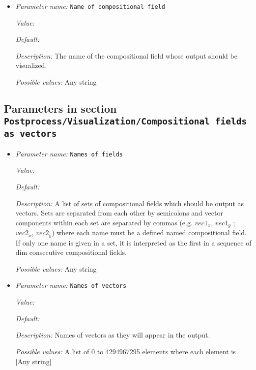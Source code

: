 \begin{itemize}
\item {\it Parameter name:} {\tt Name of compositional field}
\label{parameters:Postprocess/Visualization/Artificial viscosity composition/Name of compositional field}
\label{parameters:Postprocess/Visualization/Artificial_20viscosity_20composition/Name_20of_20compositional_20field}


{\it Value:} 


{\it Default:} 


{\it Description:} The name of the compositional field whose output should be visualized. 


{\it Possible values:} Any string
\end{itemize}

\subsection{Parameters in section \tt Postprocess/Visualization/Compositional fields as vectors}
\label{parameters:Postprocess/Visualization/Compositional_20fields_20as_20vectors}

\begin{itemize}
\item {\it Parameter name:} {\tt Names of fields}
\label{parameters:Postprocess/Visualization/Compositional fields as vectors/Names of fields}
\label{parameters:Postprocess/Visualization/Compositional_20fields_20as_20vectors/Names_20of_20fields}


{\it Value:} 


{\it Default:} 


{\it Description:} A list of sets of compositional fields which should be output as vectors. Sets are separated from each other by semicolons and vector components within each set are separated by commas (e.g. $vec1_x$, $vec1_y$ ; $vec2_x$, $vec2_y$) where each name must be a defined named compositional field. If only one name is given in a set, it is interpreted as the first in a sequence of dim consecutive compositional fields.


{\it Possible values:} Any string
\item {\it Parameter name:} {\tt Names of vectors}
\label{parameters:Postprocess/Visualization/Compositional fields as vectors/Names of vectors}
\label{parameters:Postprocess/Visualization/Compositional_20fields_20as_20vectors/Names_20of_20vectors}


{\it Value:} 


{\it Default:} 


{\it Description:} Names of vectors as they will appear in the output.


{\it Possible values:} A list of 0 to 4294967295 elements where each element is [Any string]
\end{itemize}

